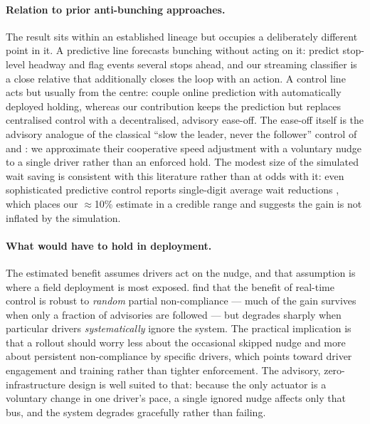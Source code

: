\documentclass[final,5p,times,twocolumn,authoryear]{elsarticle}
\begin{document}
\paragraph{Relation to prior anti-bunching approaches.}
The result sits within an established lineage but occupies a deliberately different point in it.
A predictive line forecasts bunching without acting on it: \citet{Yu2016} predict stop-level
headway and flag events several stops ahead, and our streaming classifier is a close relative that
additionally closes the loop with an action. A control line acts but usually from the centre:
\citet{MoreiraMatias2016} couple online prediction with automatically deployed holding, whereas our
contribution keeps the prediction but replaces centralised control with a decentralised, advisory
ease-off. The ease-off itself is the advisory analogue of the classical ``slow the leader, never the
follower'' control of \citet{Daganzo2009} and \citet{DaganzoPilachowski2011}: we approximate their
cooperative speed adjustment with a voluntary nudge to a single driver rather than an enforced
hold. The modest size of the simulated wait saving is consistent with this literature rather than at
odds with it: even sophisticated predictive control reports single-digit average wait reductions
\citep{MoreiraMatias2016}, which places our $\approx$10\% estimate in a credible range and suggests
the gain is not inflated by the simulation.

\paragraph{What would have to hold in deployment.}
The estimated benefit assumes drivers act on the nudge, and that assumption is where a field
deployment is most exposed. \citet{Phillips2015} find that the benefit of real-time control is
robust to \emph{random} partial non-compliance --- much of the gain survives when only a fraction of
advisories are followed --- but degrades sharply when particular drivers \emph{systematically} ignore
the system. The practical implication is that a rollout should worry less about the occasional
skipped nudge and more about persistent non-compliance by specific drivers, which points toward
driver engagement and training rather than tighter enforcement. The advisory, zero-infrastructure
design is well suited to that: because the only actuator is a voluntary change in one driver's pace,
a single ignored nudge affects only that bus, and the system degrades gracefully rather than failing.
\end{document}
